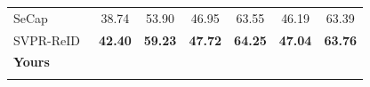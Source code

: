 \documentclass[runningheads]{llncs}
\makeatletter
\let\leaderboards@table\table
\let\leaderboards@endtable\endtable
\renewenvironment{table}[1][]{\leaderboards@table[H]}{\leaderboards@endtable}
\makeatother
\begin{document}
\begin{table}[t]
\begin{tabular}{lcccccc}
    SeCap~\cite{wang2025secap}         & 38.74                               & 53.90                  & 46.95                   & 63.55                  & 46.19                   & 63.39                  \\
    SVPR-ReID~\cite{zheng2026semantic} & \textbf{42.40}                      & \textbf{59.23}         & \textbf{47.72}          & \textbf{64.25}         & \textbf{47.04}          & \textbf{63.76}         \\
    \Xhline{0.6pt}
    \rowcolor{gray!15}
    \textbf{Yours}                     & \textbf{}                           & \textbf{}              & \textbf{}               & \textbf{}              & \textbf{}               & \textbf{}              \\
    \Xhline{1.0pt}
  \end{tabular}
\end{table}




\end{document}
